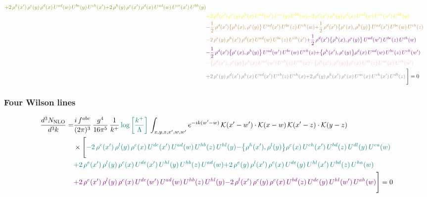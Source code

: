 \documentclass[9pt]{article}
\numberwithin{equation}{section}
\begin{document}
\begin{align}
{\color{olive}+2\,\rho^{h}(x')\,\rho^{e}(y)\,\rho^{d}(x)\,U^{ad}(w)\,U^{be}(y)\,U^{ch}(x')}{\color{olive}+2\,\rho^{h}(y)\,\rho^{e}(x')\,\rho^{d}(x)\,U^{ad}(w)\,U^{ce}(x')\,U^{bh}(y)}\notag \\ & {\color{yellow}+2\,\rho^{d}(x')\,\rho^{e}(y)\,\rho^{h}(x)\,U^{ad}(w')\,U^{ce}(y)\,U^{bh}(w)}{\color{yellow}-2\,\rho^{e}(x')\,\rho^{h}(y)\,\rho^{d}(x)\,U^{ad}(w)\,U^{ce}(w')\,U^{bh}(y)}\notag \\ & {\color{brown}-\frac{1}{2}\,\rho^{d}(x')\big\{\rho^{h}(x),\rho^{e}(y)\big\}\,U^{ad}(x')\,U^{be}(z)\,U^{ch}(w)}{\color{brown}+\frac{1}{2}\,\rho^{d}(x')\big\{\rho^{e}(x),\rho^{h}(y)\big\}\,U^{ad}(x')\,U^{be}(w)\,U^{ch}(z)}\notag \\
&{\color{brown}-2\,\rho^{e}(y)\,\rho^{h}(x')\,\rho^{d}(x)\,U^{ad}(w)\,U^{be}(z)\,U^{ch}(x')}{\color{violet}+\frac{1}{2}\,\rho^{d}(x')\big\{\rho^{h}(x),\rho^{e}(y)\big\}\,U^{ad}(w')\,U^{be}(z)\,U^{ch}(w)}\notag \\ & {\color{violet}-\frac{1}{2}\,\rho^{d}(x')\big\{\rho^{e}(x),\rho^{h}(y)\big\}\,U^{ad}(w')\,U^{be}(w)\,U^{ch}(z)}{\color{violet}+\big\{\rho^{h}(x'),\rho^{e}(y)\big\}\rho^{d}(x)\,U^{ad}(w)\,U^{be}(z)\,U^{ch}(w')}\notag \\ &{\color{pink}-\big\{\rho^{d}(x'),\rho^{e}(y)\big\}\rho^{h}(x)\,U^{ad}(w')\,U^{eb}(z)\,U^{ch}(x)}{\color{pink}-\big\{\rho^{h}(x'),\rho^{d}(y)\big\}\rho^{e}(x)\,U^{db}(z)\,U^{ae}(x)\,U^{ch}(w')}\notag \\ &{\color{gray}+2\,\rho^{e}(y)\,\rho^{d}(x')\, \rho^{h}(x)\, U^{ad}(x')\,U^{eb}(z)\,U^{ch}(x)}{\color{gray}+2\,\rho^{d}(y)\,\rho^{h}(x')\,\rho^{e}(x)\,U^{ae}(x)\,U^{ch}(x')\,U^{db}(z)}\,\Bigg] = 0
\end{align}    
\subsubsection{Four Wilson lines}
\begin{align}
    \frac{d^{3}N_{\rm NLO}}{d^{3}k}= & \frac{i\,f^{abc}}{(2\pi)^{3}}\,\frac{g^{4}}{16\pi^{5}}\,\frac{1}{k^{+}}\,{\color{teal}\log{\left[\frac{k^{+}}{\Lambda}\right]}}\,\int_{x,y,z,x',w,w'}e^{-ik(w'-w)}\,\mathcal{K}(x'-w')\cdot\mathcal{K}(x-w)\,\mathcal{K}(x'-z)\cdot\mathcal{K}(y-z)\notag \\ & \times\Bigg[{\color{teal}-2\,\rho^{e}(x')\,\rho^{l}(y)\,\rho^{c}(x)\, U^{de}(x')\,U^{ad}(w)\,U^{hb}(z)\,U^{hl}(y)}{\color{teal}-\big\{\rho^{h}(x'),\rho^{l}(y)\big\}\rho^{c}(x)\,U^{eh}(x')\,U^{bd}(z)\,U^{dl}(y)\,U^{ea}(w)}\notag \\ & {\color{teal}+2\,\rho^{e}(x')\,\rho^{l}(y)\, \rho^{c}(x)\, U^{de}(x')\,U^{hl}(y)\,U^{hb}(z)\,U^{ad}(w)} {\color{teal}+2\,\rho^{e}(y)\,\rho^{l}(x')\, \rho^{c}(x)\, U^{de}(y)\,U^{hl}(x')\,U^{bd}(z)\,U^{ha}(w)}\notag \\ & {\color{violet}+2\,\rho^{e}(x')\,\rho^{l}(y)\,\rho^{c}(x)\, U^{de}(w')\,U^{ad}(w)\,U^{hb}(z)\,U^{hl}(y)}{\color{violet}-2\,\rho^{l}(x')\,\rho^{e}(y)\, \rho^{c}(x)\, U^{bd}(z)\,U^{de}(y)\,U^{hl}(w')\,U^{ah}(w)}\Bigg] = 0
\end{align}    
\end{document}
